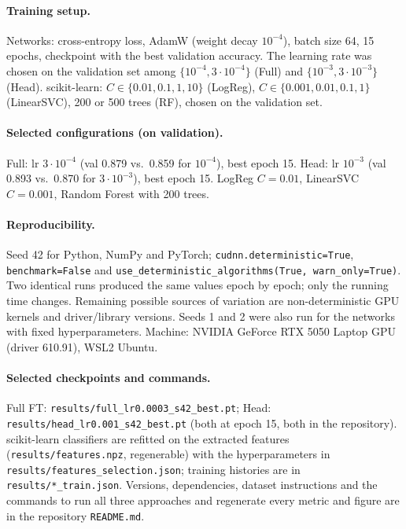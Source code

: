 \documentclass[11pt,a4paper]{article}
\newcommand{\gpuinfo}{NVIDIA GeForce RTX 5050 Laptop GPU (driver 610.91)}
\begin{document}
\paragraph{Training setup.} Networks: cross-entropy loss, AdamW (weight decay $10^{-4}$), batch
size 64, 15 epochs, checkpoint with the best validation accuracy. The learning rate was chosen
on the validation set among $\{10^{-4}, 3\cdot10^{-4}\}$ (Full) and
$\{10^{-3}, 3\cdot10^{-3}\}$ (Head). scikit-learn: $C\in\{0.01,0.1,1,10\}$ (LogReg),
$C\in\{0.001,0.01,0.1,1\}$ (LinearSVC), 200 or 500 trees (RF), chosen on the validation set.

\paragraph{Selected configurations (on validation).} Full: lr $3\cdot10^{-4}$ (val 0.879 vs.\
0.859 for $10^{-4}$), best epoch 15. Head: lr $10^{-3}$ (val 0.893 vs.\ 0.870 for
$3\cdot10^{-3}$), best epoch 15. LogReg $C=0.01$, LinearSVC $C=0.001$, Random Forest with
200 trees.

\paragraph{Reproducibility.} Seed 42 for Python, NumPy and PyTorch;
\texttt{cudnn.deterministic=True}, \texttt{benchmark=False} and
\texttt{use\_deterministic\_algorithms(True, warn\_only=True)}. Two identical runs produced
the same values epoch by epoch; only the running time changes. Remaining possible sources of
variation are non-deterministic GPU kernels and driver/library versions. Seeds 1 and 2 were
also run for the networks with fixed hyperparameters. Machine: \gpuinfo, WSL2 Ubuntu.

\paragraph{Selected checkpoints and commands.} Full FT:
\texttt{results/\allowbreak full\_\allowbreak lr0.0003\_\allowbreak s42\_\allowbreak best.pt};
Head: \texttt{results/\allowbreak head\_\allowbreak lr0.001\_\allowbreak s42\_\allowbreak best.pt}
(both at epoch 15, both in the repository). scikit-learn classifiers are refitted on the
extracted features (\texttt{results/features.npz}, regenerable) with the hyperparameters in
\texttt{results/\allowbreak features\_\allowbreak selection.json}; training histories are in
\texttt{results/*\_train.json}. Versions, dependencies, dataset instructions and the commands
to run all three approaches and regenerate every metric and figure are in the repository
\texttt{README.md}.
\end{document}
